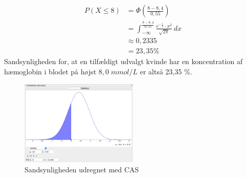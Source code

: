 \documentclass{article}
\begin{document}
\begin{equation*}
\begin{split}
  P(X \leq 8)&= \Phi \left(\frac{8- 8,4}{0,55}\right) \\
  &=\int_{-\infty }^{\frac{8-8,4}{0,55}} \frac{e^{- \frac{1}{2}} \cdot x ^2}{\sqrt{2 \pi } } \,dx \\
  &\approx 0,2335\\
  &=23,35 \%
\end{split}
\end{equation*}
Sandsynligheden for, at en tilfældigt udvalgt kvinde har en koncentration af hæmoglobin i blodet på højst $8,0 \;\unit{mmol/L} $ er altså 23,35 \%. 
\begin{figure}[H]
\begin{center}
  \includegraphics[width=0.5\textwidth]{CASleq8.png}
\end{center}
\caption{Sandsynligheden udregnet med CAS}
\label{fig:CASleq8}
\end{figure}
\end{document}
